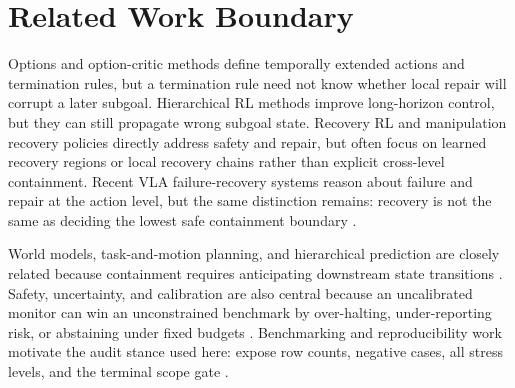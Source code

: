 \documentclass{article}
\begin{document}
\section{Related Work Boundary}
Options and option-critic methods define temporally extended actions and termination rules, but a termination rule need not know whether local repair will corrupt a later subgoal. Hierarchical RL methods improve long-horizon control, but they can still propagate wrong subgoal state. Recovery RL and manipulation recovery policies directly address safety and repair, but often focus on learned recovery regions or local recovery chains rather than explicit cross-level containment. Recent VLA failure-recovery systems reason about failure and repair at the action level, but the same distinction remains: recovery is not the same as deciding the lowest safe containment boundary \citep{duan2024aha31,lee2025lazydash32,pham2024adaptive33,naito2024taskpriority34,yang2026a35,zhang2021explainable36,hangl2016robotic37,kalluraya2024minimumviolation38,ramezani2023safe39,kwon2025kinodynamic40,kim2026humanoid41,yu2026discovery42,meyer2022users43,cheng2021humanaware44,zhang2025modified45,johannsmeier2017a46,ribasxirgo2026simulatorbased47,pesenti2023imubased48}.

World models, task-and-motion planning, and hierarchical prediction are closely related because containment requires anticipating downstream state transitions \citep{tang2021a49,tabatabaei2025gazing50,zheng2024statedependent51,wu2025robot52,hayes2016autonomously53,yamashita2025skill54,caldas2022tasklevel55,zhao2025manipbench56,du2026perceptive57,martinbarrio2020design58,liang2021searchbased59,sheidlower2024towards60,xie2026a61,johannsmeier2016a62,rojas2016robot63,zhou2022reactive64,bryan2012automatic65,li2023design66}. Safety, uncertainty, and calibration are also central because an uncalibrated monitor can win an unconstrained benchmark by over-halting, under-reporting risk, or abstaining under fixed budgets \citep{cai2022hierarchical67,chand2021multilevel68,liang2021enduser69,deroo2023the70,hansen2024hierarchical71,takayanagi2019hierarchical72,ding2023cluster73,mizannddynamic74,rana2022residual75,zhang2021hierarchical76,tian2021redesigning77,qu2023robotic78,mueller2022design79,hoffman2025addressing80,mizannddynamic81,soni2005reinforcement82,lan2021a83,ekvall2008robot84}. Benchmarking and reproducibility work motivate the audit stance used here: expose row counts, negative cases, all stress levels, and the terminal scope gate \citep{hong2023robust85,shin2024consumers86,osada2024reflectance87,fu2023the88,luo2023decompositionbased89,sun2019rtpo90,fan2020multirobot91,adubredu2022elephants92,ren2026learning93,huang2025a94,sakib2024consolidating95,jin2022robotic96,przystupa2024learning97,oltramari2024enabling98,wu2023design99}.
\end{document}
